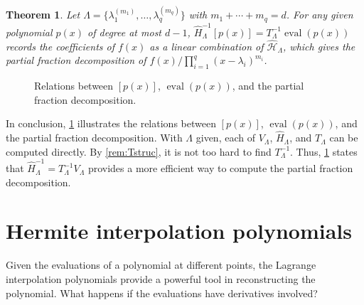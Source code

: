\documentclass{article}
\newtheorem{theorem}{Theorem}[section]
\theoremstyle{definition}
\newcommand{\eval}{\operatorname{eval}}
\begin{document}
\begin{theorem}
\label{thm:parbyt}
Let $\Lambda = \{\lambda_1^{(m_1)}, \dots, 
\lambda_q^{(m_q)}\}$ with $m_1 + \cdots + m_q = d$.  For any given polynomial $p(x)$ of degree at most $d-1$, $\hat{H}^{-1}_\Lambda [p(x)] = T^{-1}_\Lambda \eval(p(x))$ records the coefficients of $f(x)$ as a linear combination of $\hat{\mathcal{H}}_\Lambda$, which gives the partial fraction decomposition of $f(x)/\prod_{i=1}^q (x - \lambda_i)^{m_i}$.
\end{theorem}

\begin{figure}[h]
    \centering
    \caption{Relations between $[p(x)]$, $\eval(p(x))$, and the partial fraction decomposition.}
    \label{fig:relations}
\end{figure}

In conclusion, \cref{fig:relations} illustrates the relations between $[p(x)]$, $\eval(p(x))$, and the partial fraction decomposition.  With $\Lambda$ given, each of $V_\Lambda$, $\hat{H}_\Lambda$, and $T_\Lambda$ can be computed directly.  By \cref{rem:Tstruc}, it is not too hard to find $T_\Lambda^{-1}$.  Thus, \cref{thm:parbyt} states that $\hat{H}_\Lambda^{-1} = T_\Lambda^{-1} V_\Lambda$ provides a more efficient way to compute the partial fraction decomposition.

\section{Hermite interpolation polynomials}

Given the evaluations of a polynomial at different points, the Lagrange interpolation polynomials provide a powerful tool in reconstructing the polynomial.  What happens if the evaluations have derivatives involved?
\end{document}
